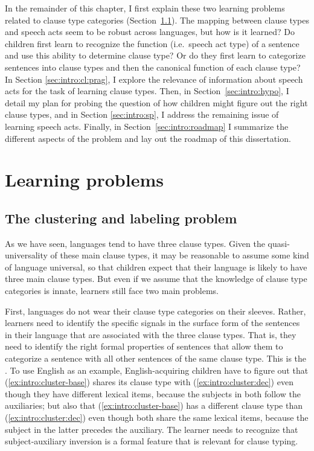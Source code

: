 In the remainder of this chapter, I first explain these two learning problems related to clause type categories (Section~\ref{sec:intro:cl:problem}). The mapping between clause types and speech acts seem to be robust across languages, but how is it learned? Do children first learn to recognize the function (i.e.\ speech act type) of a sentence and use this ability to determine clause type? Or do they first learn to categorize sentences into clause types and then the canonical function of each clause type? In Section \ref{sec:intro:cl:prag}, I explore the relevance of information about speech acts for the task of learning clause types. Then, in Section~\ref{sec:intro:hypo}, I detail my plan for probing the question of how children might figure out the right clause types, and in Section \ref{sec:intro:sp}, I address the remaining issue of learning speech acts. Finally, in Section~\ref{sec:intro:roadmap} I summarize the different aspects of the problem and lay out the roadmap of this dissertation. 

\section{Learning problems}
\label{sec:intro:cl}
\subsection{The clustering and labeling problem}
\label{sec:intro:cl:problem}

As we have seen, languages tend to have three clause types.  Given the quasi-universality of these main clause types, it may be reasonable to assume some kind of language universal, so that children expect that their language is likely to have three main clause types. But even if we assume that the knowledge of clause type categories is innate, learners still face two main problems.

First, languages do not wear their clause type categories on their sleeves. Rather, learners need to identify the specific signals in the surface form of the sentences in their language that are associated with the three clause types. That is, they need to identify the right formal properties of sentences that allow them to categorize a sentence with all other sentences of the same clause type. This is the .
To use English as an example, English-acquiring children have to figure out that (\ref{ex:intro:cluster-base}) shares its clause type with (\ref{ex:intro:cluster:dec}) even though they have different lexical items, because the subjects in both follow the auxiliaries; but also that (\ref{ex:intro:cluster-base}) has a different clause type than (\ref{ex:intro:cluster:dec}) even though both share the same lexical items, because the subject in the latter precedes the auxiliary. The learner needs to recognize that subject-auxiliary inversion is a formal feature that is relevant for clause typing.

